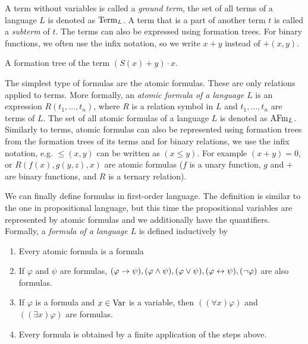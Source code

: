 A term without variables is called a \emph{ground term}, the set of all terms of a language $L$ is denoted as $\operatorname{Term}_L$. A term that is a part of another term $t$ is called a \emph{subterm} of $t$. The terms can also be expressed using formation trees. For binary functions, we often use the infix notation, so we write $x+y$ instead of $+(x,y)$.

\begin{marginfigure}[-6\baselineskip]
\centering
{}
\caption{A formation tree of the term $(S(x) + y)\cdot x$.}
\end{marginfigure}

The simplest type of formulas are the atomic formulas. These are only relations applied to terms. More formally, an \emph{atomic formula of a language $L$} is an expression $R(t_1, \dots, t_n)$, where $R$ is a relation symbol in $L$ and $t_1, \dots, t_n$ are terms of $L$. The set of all atomic formulas of a language $L$ is denoted as $\operatorname{AFm}_L$. Similarly to terms, atomic formulas can also be represented using formation trees from the formation trees of its terms and for binary relations, we use the infix notation, e.g. $\leq(x, y)$ can be written as $(x \leq y)$. For example $(x + y) = 0$, or $R(f(x), g(y,z), x)$ are atomic formulas ($f$ is a unary function, $g$ and $+$ are binary functions, and $R$ is a ternary relation).

We can finally define formulas in first-order language. The definition is similar to the one in propositional language, but this time the propositional variables are represented by atomic formulas and we additionally have the quantifiers. Formally, a \emph{formula of a language $L$} is defined inductively by
\begin{enumerate}
  \item Every atomic formula is a formula
  \item If $\varphi$ and $\psi$ are formulas, $(\varphi \to \psi), (\varphi \land \psi), (\varphi \lor \psi), (\varphi \leftrightarrow \psi), (\neg \varphi)$ are also formulas.
  \item If $\varphi$ is a formula and $x \in \operatorname{Var}$ is a variable, then $((\forall x)\varphi)$ and $((\exists x)\varphi)$ are formulas.
  \item Every formula is obtained by a finite application of the steps above.
\end{enumerate}

